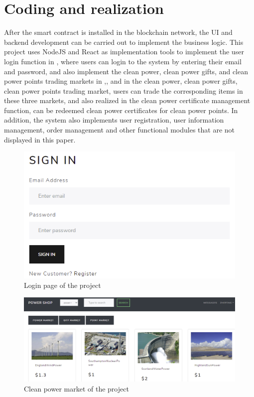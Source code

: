 \section{Coding and realization}
After the smart contract is installed in the blockchain network, the UI and backend development can be carried out to implement the business logic. This project uses NodeJS and React as implementation tools to implement the user login function in , where users can login to the system by entering their email and password, and also implement the clean power, clean power gifts, and clean power points trading markets in ,, and  in the clean power, clean power gifts, clean power points trading market, users can trade the corresponding items in these three markets, and also realized  in the clean power certificate management function, can be redeemed clean power certificates for clean power points. In addition, the system also implements user registration, user information management, order management and other functional modules that are not displayed in this paper.
\begin{figure}[!htb]
    \centering
    \includegraphics[width=.6 \textwidth]{img/login.png}
    \caption{Login page of the project}
    \label{fig:login}
\end{figure}
\begin{figure}[!htb]
    \centering
    \includegraphics[width= .7\textwidth]{img/powermarket.png}
    \caption{Clean power market of the project}
    \label{fig:powermarket}
\end{figure}
